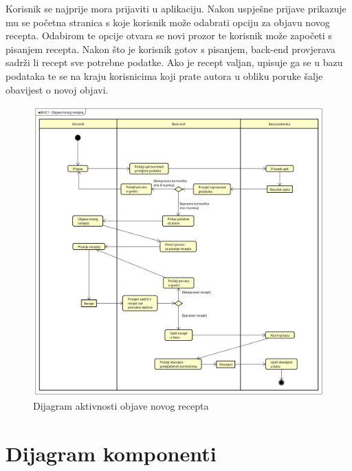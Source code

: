 			 Korisnik se najprije mora prijaviti u aplikaciju. Nakon uspješne prijave prikazuje mu se početna stranica s koje korisnik može odabrati opciju za objavu novog recepta. Odabirom te opcije otvara se novi prozor te korisnik može započeti s pisanjem recepta. Nakon što je korisnik gotov s pisanjem, back-end provjerava sadrži li recept sve potrebne podatke. Ako je recept valjan, upisuje ga se u bazu podataka te se na kraju korisnicima koji prate autora u obliku poruke šalje obavijest o novoj objavi.
			 \begin{figure}
			 	\includegraphics[scale=0.41]{slike/dijagram_aktivnosti.png}
			 	\centering
			 	\caption{Dijagram aktivnosti objave novog recepta}
			 	\label{fig:Dijagram_aktivnosti objave novog recepta}
			 \end{figure}
			 
			\eject
		\section{Dijagram komponenti}
		
